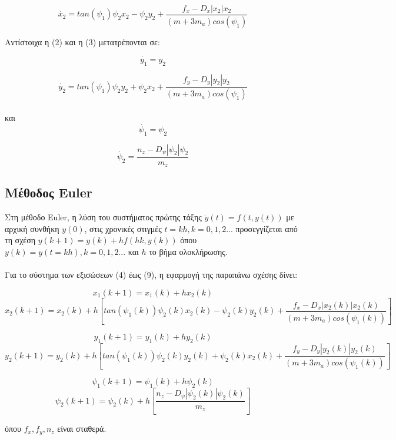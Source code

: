 \documentclass{article}
\begin{document}
\begin{equation}
\dot{x_2} = tan(\psi_1)\psi_2x_2 - \psi_2y_2 + \frac{f_x - D_x|x_2|x_2}{(m + 3m_a)cos(\psi_1)} 
\end{equation}

Αντίστοιχα η (2) και η (3) μετατρέπονται σε:

\begin{equation}
\dot{y_1} = y_2
\end{equation}

\begin{equation}
\dot{y_2} = tan(\psi_1)\psi_2y_2 + \psi_2x_2 + \frac{f_y - D_y|y_2|y_2}{(m + 3m_a)cos(\psi_1)} 
\end{equation}
\\
και
\\
\begin{equation}
\dot{\psi_1} = \psi_2
\end{equation}

\begin{equation}
\dot{\psi_2} = \frac{n_z - D_\psi|\psi_2|\psi_2}{m_z} 
\end{equation}

\subsection{Μέθοδος Euler}
Στη μέθοδο Euler, η λύση του συστήματος πρώτης τάξης \(\dot{y}(t) = f(t, y(t))\) με αρχική συνθήκη \(y(0)\), στις χρονικές στιγμές \(t = kh, k = 0, 1, 2...\) προσεγγίζεται από τη σχέση \(y(k+1) = y(k) + hf(hk, y(k))\) όπου \(y(k) = y(t = kh), k = 0, 1, 2...\) και \(h\) το βήμα ολοκλήρωσης.
\\\\
Για το σύστημα των εξισώσεων (4) έως (9), η εφαρμογή της παραπάνω σχέσης δίνει:

\[x_1(k+1) = x_1(k) + hx_2(k)\]
\[x_2(k+1) = x_2(k) + h[tan(\psi_1(k))\psi_2(k)x_2(k) - \psi_2(k)y_2(k) + \frac{f_x - D_x|x_2(k)|x_2(k)}{(m + 3m_a)cos(\psi_1(k))}]\]

\[ y_1(k+1)   = y_1(k) + hy_2(k)   \]
\[y_2(k+1) = y_2(k) + h[tan(\psi_1(k))\psi_2(k)y_2(k) + \psi_2(k)x_2(k) + \frac{f_y - D_y|y_2(k)|y_2(k)}{(m + 3m_a)cos(\psi_1(k))}]\]


\[ \psi_1(k+1)   = \psi_1(k) + h\psi_2(k)   \]
\[ \psi_2(k+1) = \psi_2(k) + h[\frac{n_z - D_\psi|\psi_2(k)|\psi_2(k)}{m_z}]\]

όπου \(f_x, f_y, n_z\) είναι σταθερά.
\end{document}
